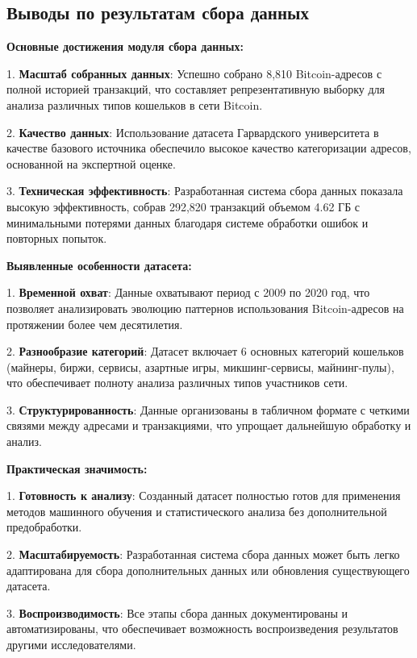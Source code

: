 \subsection{Выводы по результатам сбора данных}

\textbf{Основные достижения модуля сбора данных:}

1. \textbf{Масштаб собранных данных}: Успешно собрано 8,810 Bitcoin-адресов с полной историей транзакций, что составляет репрезентативную выборку для анализа различных типов кошельков в сети Bitcoin.

2. \textbf{Качество данных}: Использование датасета Гарвардского университета в качестве базового источника обеспечило высокое качество категоризации адресов, основанной на экспертной оценке.

3. \textbf{Техническая эффективность}: Разработанная система сбора данных показала высокую эффективность, собрав 292,820 транзакций объемом 4.62 ГБ с минимальными потерями данных благодаря системе обработки ошибок и повторных попыток.

\textbf{Выявленные особенности датасета:}

1. \textbf{Временной охват}: Данные охватывают период с 2009 по 2020 год, что позволяет анализировать эволюцию паттернов использования Bitcoin-адресов на протяжении более чем десятилетия.

2. \textbf{Разнообразие категорий}: Датасет включает 6 основных категорий кошельков (майнеры, биржи, сервисы, азартные игры, микшинг-сервисы, майнинг-пулы), что обеспечивает полноту анализа различных типов участников сети.

3. \textbf{Структурированность}: Данные организованы в табличном формате с четкими связями между адресами и транзакциями, что упрощает дальнейшую обработку и анализ.

\textbf{Практическая значимость:}

1. \textbf{Готовность к анализу}: Созданный датасет полностью готов для применения методов машинного обучения и статистического анализа без дополнительной предобработки.

2. \textbf{Масштабируемость}: Разработанная система сбора данных может быть легко адаптирована для сбора дополнительных данных или обновления существующего датасета.

3. \textbf{Воспроизводимость}: Все этапы сбора данных документированы и автоматизированы, что обеспечивает возможность воспроизведения результатов другими исследователями.
